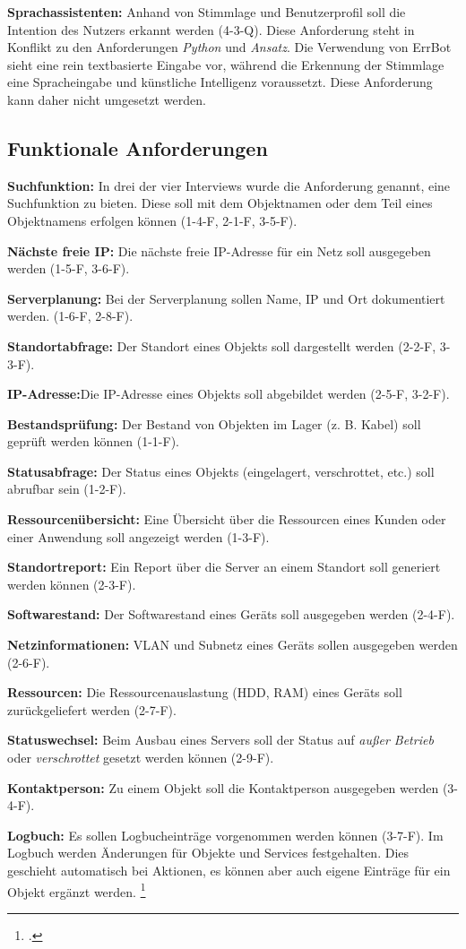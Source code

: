 \textbf{Sprachassistenten:} Anhand von Stimmlage und Benutzerprofil soll die Intention des Nutzers erkannt werden (4-3-Q). Diese Anforderung steht in Konflikt zu den Anforderungen \textit{Python} und \textit{Ansatz}. Die Verwendung von ErrBot sieht eine rein textbasierte Eingabe vor, während die Erkennung der Stimmlage eine Spracheingabe und künstliche Intelligenz voraussetzt. Diese Anforderung kann daher nicht umgesetzt werden.


\subsection{Funktionale Anforderungen}
\textbf{Suchfunktion: } In drei der vier Interviews wurde die Anforderung genannt, eine Suchfunktion zu bieten. Diese soll mit dem Objektnamen oder dem Teil eines Objektnamens erfolgen können (1-4-F, 2-1-F, 3-5-F).

\textbf{Nächste freie IP: } Die nächste freie IP-Adresse für ein Netz soll ausgegeben werden (1-5-F, 3-6-F). 

\textbf{Serverplanung: } Bei der Serverplanung sollen Name, IP und Ort dokumentiert werden. (1-6-F, 2-8-F).

\textbf{Standortabfrage: } Der Standort eines Objekts soll dargestellt werden (2-2-F, 3-3-F).

\textbf{IP-Adresse:}Die IP-Adresse eines Objekts soll abgebildet werden (2-5-F, 3-2-F).

\textbf{Bestandsprüfung:} Der Bestand von Objekten im Lager (z. B. Kabel) soll geprüft werden können (1-1-F).

\textbf{Statusabfrage: }Der Status eines Objekts (eingelagert, verschrottet, etc.) soll abrufbar sein (1-2-F).

\textbf{Ressourcenübersicht:} Eine Übersicht über die Ressourcen eines Kunden oder einer Anwendung soll angezeigt werden (1-3-F).

\textbf{Standortreport:} Ein Report über die Server an einem Standort soll generiert werden können (2-3-F).

\textbf{Softwarestand:} Der Softwarestand eines Geräts soll ausgegeben werden (2-4-F).

\textbf{Netzinformationen:} VLAN und Subnetz eines Geräts sollen ausgegeben werden (2-6-F).

\textbf{Ressourcen: } Die Ressourcenauslastung (HDD, RAM) eines Geräts soll zurückgeliefert werden (2-7-F).

\textbf{Statuswechsel:} Beim Ausbau eines Servers soll der Status auf \textit{außer Betrieb} oder \textit{verschrottet} gesetzt werden können (2-9-F).

\textbf{Kontaktperson:} Zu einem Objekt soll die Kontaktperson ausgegeben werden (3-4-F).

\textbf{Logbuch:} Es sollen Logbucheinträge vorgenommen werden können (3-7-F). Im Logbuch werden Änderungen für Objekte und Services festgehalten. Dies geschieht automatisch bei Aktionen, es können aber auch eigene Einträge für ein Objekt ergänzt werden.
\footcite[Vgl.][o. \pno]{idoit_2019_logbuch}


